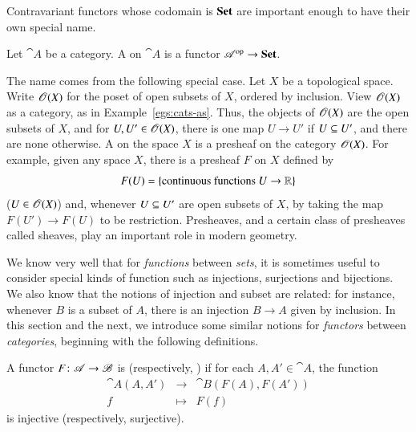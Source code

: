 Contravariant functors whose codomain is $\mathbf{Set}$ are important enough to have
their own special name.

\begin{defn}
\label{defn:presheaf}
Let $\cat{A}$ be a category.  A %
%
%
on $\cat{A}$ is a functor $\mathscr{A}^{\mathrm{op}} \to \mathbf{Set}$.
\end{defn}

The name comes from the following special case.  Let $X$ be a topological
space.  Write $\operatorname{\mathscr{O}}(X)$%
%
%
for the poset of open subsets of $X$, ordered by inclusion.  View
$\operatorname{\mathscr{O}}(X)$ as a category, as in
Example~\ref{egs:cats-as}.  Thus, the objects of
$\operatorname{\mathscr{O}}(X)$ are the open subsets of $X$, and for $U, U' \in \operatorname{\mathscr{O}}(X)$, there
is one map $U \to U'$ if $U \subseteq U'$, and there are none otherwise.  A
 on the space $X$ is a presheaf on the category $\operatorname{\mathscr{O}}(X)$.
For example, given any space $X$, there is a presheaf $F$ on $X$ defined by
\[
F(U) = \{ \text{continuous functions } U \to \reals \}
%
\index{topological space!functions on}
%
\]
($U \in \operatorname{\mathscr{O}}(X)$) and, whenever $U \subseteq U'$ are open subsets of $X$, by
taking the map $F(U') \to F(U)$ to be restriction.  Presheaves, and a
certain class of presheaves called sheaves,%
%
%
play an important role in modern geometry.%
%
%

\subjectchange

We know very well that for \emph{functions} between \emph{sets}, it is
sometimes useful to consider special kinds of function such as injections,
surjections and bijections.  We also know that the notions of injection and
subset are related: for instance, whenever $B$ is a subset of $A$, there is
an injection $B \to A$ given by inclusion.  In this section and the next,
we introduce some similar notions for \emph{functors} between
\emph{categories}, beginning with the following definitions.

\begin{defn}
A functor $F\from  \cat{A} \to \cat{B}$ is %
%
%
%
(respectively, )%
%
%
if for each $A, A' \in \cat{A}$, the function
\[
\begin{array}{ccc}
\cat{A}(A, A')  &\to            &\cat{B}(F(A), F(A'))   \\
f               &\mapsto        &F(f)
\end{array}
\]
is injective (respectively, surjective).
\end{defn}

